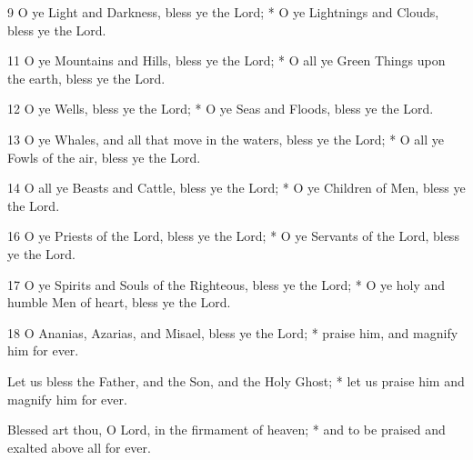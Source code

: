 9 O ye Light and Darkness, bless ye the Lord; * O ye Lightnings and Clouds, bless ye the Lord.


11 O ye Mountains and Hills, bless ye the Lord; * O all ye Green Things upon the earth, bless ye the Lord.

12 O ye Wells, bless ye the Lord; * O ye Seas and Floods, bless ye the Lord.

13 O ye Whales, and all that move in the waters, bless ye the Lord; * O all ye Fowls of the air, bless ye the Lord.

14 O all ye Beasts and Cattle, bless ye the Lord; * O ye Children of Men, bless ye the Lord.


16 O ye Priests of the Lord, bless ye the Lord; * O ye Servants of the Lord, bless ye the Lord.

17 O ye Spirits and Souls of the Righteous, bless ye the Lord; * O ye holy and humble Men of heart, bless ye the Lord.

18 O Ananias, Azarias, and Misael, bless ye the Lord; * praise him, and magnify him for ever.

Let us bless the Father, and the Son, and the Holy Ghost; * let us praise him and magnify him for ever.

Blessed art thou, O Lord, in the firmament of heaven; * and to be praised and exalted above all for ever.


\medskip


{\centering\footnotesize{\par}}





